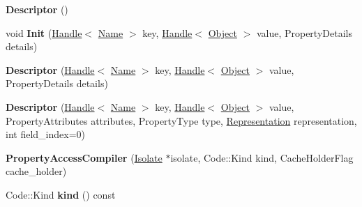 \begin{DoxyCompactItemize}
\item 
\hypertarget{classv8_1_1internal_1_1_b_a_s_e___e_m_b_e_d_d_e_d_a34045e8b9a3e30fc998a960c888c4ce8}{}{\bfseries Descriptor} ()\label{classv8_1_1internal_1_1_b_a_s_e___e_m_b_e_d_d_e_d_a34045e8b9a3e30fc998a960c888c4ce8}

\item 
\hypertarget{classv8_1_1internal_1_1_b_a_s_e___e_m_b_e_d_d_e_d_afd210f633928398ef2d4a1404431e195}{}void {\bfseries Init} (\hyperlink{classv8_1_1internal_1_1_handle}{Handle}$<$ \hyperlink{classv8_1_1internal_1_1_name}{Name} $>$ key, \hyperlink{classv8_1_1internal_1_1_handle}{Handle}$<$ \hyperlink{classv8_1_1internal_1_1_object}{Object} $>$ value, Property\+Details details)\label{classv8_1_1internal_1_1_b_a_s_e___e_m_b_e_d_d_e_d_afd210f633928398ef2d4a1404431e195}

\item 
\hypertarget{classv8_1_1internal_1_1_b_a_s_e___e_m_b_e_d_d_e_d_a702dcad16c0c87c87be780f99085d314}{}{\bfseries Descriptor} (\hyperlink{classv8_1_1internal_1_1_handle}{Handle}$<$ \hyperlink{classv8_1_1internal_1_1_name}{Name} $>$ key, \hyperlink{classv8_1_1internal_1_1_handle}{Handle}$<$ \hyperlink{classv8_1_1internal_1_1_object}{Object} $>$ value, Property\+Details details)\label{classv8_1_1internal_1_1_b_a_s_e___e_m_b_e_d_d_e_d_a702dcad16c0c87c87be780f99085d314}

\item 
\hypertarget{classv8_1_1internal_1_1_b_a_s_e___e_m_b_e_d_d_e_d_a88c4a3982977a643fdd2be0a912cfb93}{}{\bfseries Descriptor} (\hyperlink{classv8_1_1internal_1_1_handle}{Handle}$<$ \hyperlink{classv8_1_1internal_1_1_name}{Name} $>$ key, \hyperlink{classv8_1_1internal_1_1_handle}{Handle}$<$ \hyperlink{classv8_1_1internal_1_1_object}{Object} $>$ value, Property\+Attributes attributes, Property\+Type type, \hyperlink{classv8_1_1internal_1_1_representation}{Representation} representation, int field\+\_\+index=0)\label{classv8_1_1internal_1_1_b_a_s_e___e_m_b_e_d_d_e_d_a88c4a3982977a643fdd2be0a912cfb93}

\item 
\hypertarget{classv8_1_1internal_1_1_b_a_s_e___e_m_b_e_d_d_e_d_aa75fc47b1811da3a317668727879cd17}{}{\bfseries Property\+Access\+Compiler} (\hyperlink{classv8_1_1internal_1_1_isolate}{Isolate} $\ast$isolate, Code\+::\+Kind kind, Cache\+Holder\+Flag cache\+\_\+holder)\label{classv8_1_1internal_1_1_b_a_s_e___e_m_b_e_d_d_e_d_aa75fc47b1811da3a317668727879cd17}

\item 
\hypertarget{classv8_1_1internal_1_1_b_a_s_e___e_m_b_e_d_d_e_d_a53a70992d05e31c081bddce6fb01577e}{}Code\+::\+Kind {\bfseries kind} () const \label{classv8_1_1internal_1_1_b_a_s_e___e_m_b_e_d_d_e_d_a53a70992d05e31c081bddce6fb01577e}


\end{DoxyCompactItemize}
